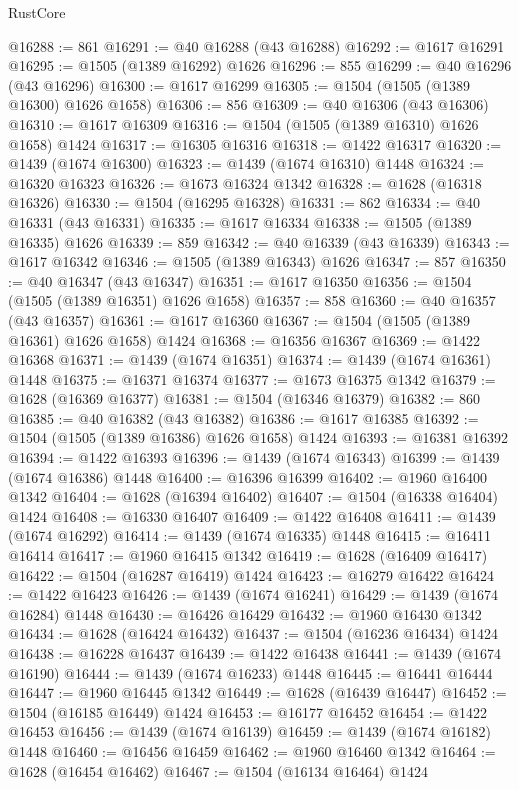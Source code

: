 \begin{lexlean}{RustCore}
\begin{coremodule}
@16288 := 861
@16291 := @40 @16288 (@43 @16288)
@16292 := @1617 @16291
@16295 := @1505 (@1389 @16292) @1626
@16296 := 855
@16299 := @40 @16296 (@43 @16296)
@16300 := @1617 @16299
@16305 := @1504 (@1505 (@1389 @16300) @1626 @1658)
@16306 := 856
@16309 := @40 @16306 (@43 @16306)
@16310 := @1617 @16309
@16316 := @1504 (@1505 (@1389 @16310) @1626 @1658) @1424
@16317 := @16305 @16316
@16318 := @1422 @16317
@16320 := @1439 (@1674 @16300)
@16323 := @1439 (@1674 @16310) @1448
@16324 := @16320 @16323
@16326 := @1673 @16324 @1342
@16328 := @1628 (@16318 @16326)
@16330 := @1504 (@16295 @16328)
@16331 := 862
@16334 := @40 @16331 (@43 @16331)
@16335 := @1617 @16334
@16338 := @1505 (@1389 @16335) @1626
@16339 := 859
@16342 := @40 @16339 (@43 @16339)
@16343 := @1617 @16342
@16346 := @1505 (@1389 @16343) @1626
@16347 := 857
@16350 := @40 @16347 (@43 @16347)
@16351 := @1617 @16350
@16356 := @1504 (@1505 (@1389 @16351) @1626 @1658)
@16357 := 858
@16360 := @40 @16357 (@43 @16357)
@16361 := @1617 @16360
@16367 := @1504 (@1505 (@1389 @16361) @1626 @1658) @1424
@16368 := @16356 @16367
@16369 := @1422 @16368
@16371 := @1439 (@1674 @16351)
@16374 := @1439 (@1674 @16361) @1448
@16375 := @16371 @16374
@16377 := @1673 @16375 @1342
@16379 := @1628 (@16369 @16377)
@16381 := @1504 (@16346 @16379)
@16382 := 860
@16385 := @40 @16382 (@43 @16382)
@16386 := @1617 @16385
@16392 := @1504 (@1505 (@1389 @16386) @1626 @1658) @1424
@16393 := @16381 @16392
@16394 := @1422 @16393
@16396 := @1439 (@1674 @16343)
@16399 := @1439 (@1674 @16386) @1448
@16400 := @16396 @16399
@16402 := @1960 @16400 @1342
@16404 := @1628 (@16394 @16402)
@16407 := @1504 (@16338 @16404) @1424
@16408 := @16330 @16407
@16409 := @1422 @16408
@16411 := @1439 (@1674 @16292)
@16414 := @1439 (@1674 @16335) @1448
@16415 := @16411 @16414
@16417 := @1960 @16415 @1342
@16419 := @1628 (@16409 @16417)
@16422 := @1504 (@16287 @16419) @1424
@16423 := @16279 @16422
@16424 := @1422 @16423
@16426 := @1439 (@1674 @16241)
@16429 := @1439 (@1674 @16284) @1448
@16430 := @16426 @16429
@16432 := @1960 @16430 @1342
@16434 := @1628 (@16424 @16432)
@16437 := @1504 (@16236 @16434) @1424
@16438 := @16228 @16437
@16439 := @1422 @16438
@16441 := @1439 (@1674 @16190)
@16444 := @1439 (@1674 @16233) @1448
@16445 := @16441 @16444
@16447 := @1960 @16445 @1342
@16449 := @1628 (@16439 @16447)
@16452 := @1504 (@16185 @16449) @1424
@16453 := @16177 @16452
@16454 := @1422 @16453
@16456 := @1439 (@1674 @16139)
@16459 := @1439 (@1674 @16182) @1448
@16460 := @16456 @16459
@16462 := @1960 @16460 @1342
@16464 := @1628 (@16454 @16462)
@16467 := @1504 (@16134 @16464) @1424

\end{coremodule}
\end{lexlean}
